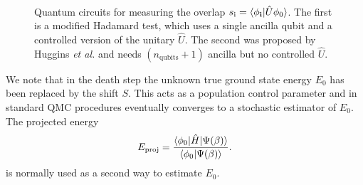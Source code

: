 \documentclass[%
 reprint,
 amsmath,amssymb,
 aps,
]{revtex4-2}
\begin{document}
\begin{figure}
    \centering
{}\\
    \caption{\small \justifying Quantum circuits for measuring the overlap $s_\mathrm{i} = \braket{\phi_\mathbf{i}|\hat U \phi_0}$. The first is a modified Hadamard test,\cite{quantumalgorithms} which uses a single ancilla qubit and a controlled version of the unitary $\hat U$. The second was proposed by Huggins \textit{et al.}\cite{Huggins2020} and needs $(n_\mathrm{qubits} + 1)$ ancilla but no controlled $\hat U$.}
    \label{fig:circs}
\end{figure}

We note that in the death step the unknown true ground state energy $E_0$ has been replaced by the shift $S$. This acts as a population control parameter and in standard QMC procedures eventually converges to a stochastic estimator of $E_0$.\cite{Booth2009} The projected energy
\begin{equation}
    E_\mathrm{proj} = \frac{\braket{\phi_0|\hat H| \Psi(\beta)}}{\braket{\phi_0|\Psi(\beta)}}.
    \label{eq:e_proj}
\end{equation}
is normally used as a second way to estimate $E_0$.
\end{document}
